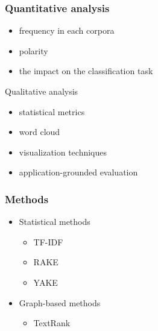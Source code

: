 \documentclass{beamer}
\begin{document}
\begin{frame}
\frametitle{Quantitative analysis}
     \begin{itemize}
        \item frequency in each corpora
        \item polarity
        \item the impact on the classification task
    \end{itemize}   
\end{frame}
\begin{frame}{Qualitative analysis}
        \begin{itemize}
        \item statistical metrics
        \item word cloud
        \item visualization techniques
        \item application-grounded evaluation
    \end{itemize}
\end{frame}



\begin{frame}
\frametitle{Methods}

\begin{itemize}
    \item Statistical methods
    \begin{itemize}
        \item TF-IDF
        \item RAKE
        \item YAKE
    \end{itemize}
    \item Graph-based methods
    \begin{itemize}
        \item TextRank
    \end{itemize}
\end{itemize}

\end{frame}
\end{document}
